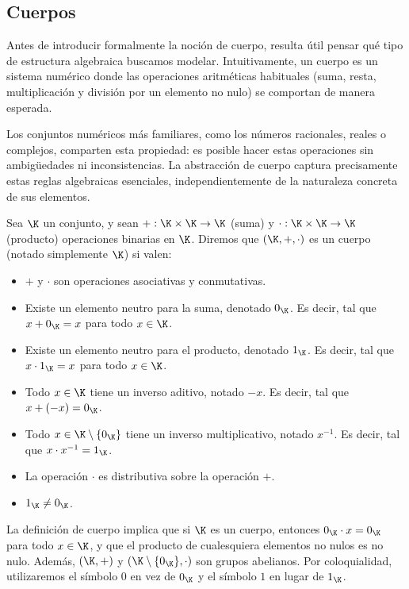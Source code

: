 
\subsection{Cuerpos}
Antes de introducir formalmente la noción de cuerpo, resulta útil pensar qué tipo de estructura algebraica buscamos modelar. Intuitivamente, un cuerpo es un sistema numérico donde las operaciones aritméticas habituales (suma, resta, multiplicación y división por un elemento no nulo) se comportan de manera esperada.

Los conjuntos numéricos más familiares, como los números racionales, reales o complejos, comparten esta propiedad: es posible hacer estas operaciones sin ambigüedades ni inconsistencias. La abstracción de cuerpo captura precisamente estas reglas algebraicas esenciales, independientemente de la naturaleza concreta de sus elementos.

\begin{definition}[Cuerpo]
	Sea $\K$ un conjunto, y sean $+: \K \times \K \to \K$ (suma) y $\cdot: \K \times \K \to \K$ (producto) operaciones binarias en $\K$. Diremos que $(\K, +, \cdot)$ es un cuerpo (notado simplemente $\K$) si valen:
	\begin{itemize}[noitemsep]
		\item $+$ y $\cdot$ son operaciones asociativas y conmutativas.
		\item Existe un elemento neutro para la suma, denotado $0_\K$. Es decir, tal que $x + 0_\K = x$ para todo $x \in \K$.
		\item Existe un elemento neutro para el producto, denotado $1_\K$. Es decir, tal que $x \cdot 1_\K = x$ para todo $x \in \K$.
		\item Todo $x \in \K$ tiene un inverso aditivo, notado $-x$. Es decir, tal que $x + (-x) = 0_\K$.
		\item Todo $x \in \K \setminus \{0_\K\}$ tiene un inverso multiplicativo, notado $x^{-1}$. Es decir, tal que $x \cdot x^{-1} = 1_\K$.
		\item La operación $\cdot$ es distributiva sobre la operación $+$.
		\item $1_\K \neq 0_\K$.
	\end{itemize}
\end{definition}

La definición de cuerpo implica que si $\K$ es un cuerpo, entonces $0_\K \cdot x = 0_\K$ para todo $x \in \K$, y que el producto de cualesquiera elementos no nulos es no nulo. Además, $(\K, +)$ y $(\K \setminus \{0_\K\}, \cdot)$ son grupos abelianos. Por coloquialidad, utilizaremos el símbolo $0$ en vez de $0_\K$ y el símbolo $1$ en lugar de $1_\K$.

